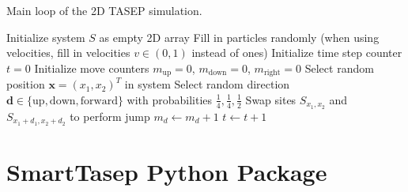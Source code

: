 \begin{algorithm}[H]
    \caption{Main loop of the 2D TASEP simulation.}
    \label{alg:2d-tasep}
    \begin{algorithmic}
        \State Initialize system $S$ as empty 2D array
        \State Fill in particles randomly (when using velocities, fill in velocities $v\in (0,1)$ instead of ones)
        \State Initialize time step counter $t=0$
        \State Initialize move counters $m_{\text{up}}=0$, $m_{\text{down}}=0$, $m_{\text{right}}=0$
            \State Select random position $\bm{x}=(x_1,x_2)^T$ in system
                \State Select random direction $\bm{d} \in \{\text{up}, \text{down}, \text{forward}\}$ with probabilities $\tfrac{1}{4}, \tfrac{1}{4}, \tfrac{1}{2}$
                    \State Swap sites $S_{x_1,x_2}$ and $S_{x_1+d_1,x_2+d_2}$ to perform jump
                    \State $m_d \gets m_d + 1$
                \EndIf
            \EndIf
            \State $t \gets t+1$
        \EndWhile
\end{algorithmic}
\end{algorithm}

  
\section{SmartTasep Python Package}
\label{sec:implementation-smarttasep}

